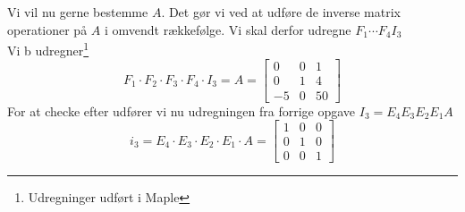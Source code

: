\documentclass[a4paper,fleqn]{article}
\begin{document}
	Vi vil nu gerne bestemme $A$. Det gør vi ved at udføre de inverse matrix operationer på $A$
	i omvendt rækkefølge. Vi skal derfor udregne $F_1 \cdots F_4 I_3$\\
	Vi b udregner\footnote{Udregninger udført i Maple\texttrademark}
	\[ F_1 \cdot F_2 \cdot F_3 \cdot F_4 \cdot I_3 = A = \begin{bmatrix}
		0&0&1\\0&1&4\\-5&0&50
	\end{bmatrix}\]
	For at checke efter udfører vi nu udregningen fra forrige opgave $I_3 = E_4E_3E_2E_1A$
	\[
	i_3 = E_4\cdot E_3\cdot E_2\cdot E_1\cdot A = \begin{bmatrix}1&0&0\\0&1&0\\0&0&1\end{bmatrix}
	\]
	
\end{document}
